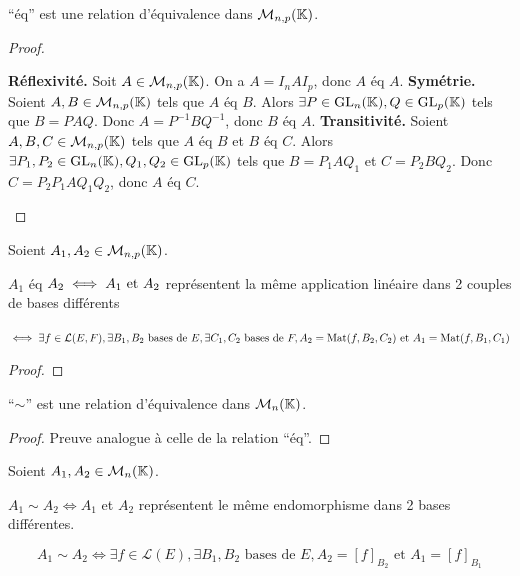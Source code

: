 \documentclass[12pt,a4paper]{report}
\begin{document}
\begin{property}
    ``éq'' est une relation d'équivalence dans $\mathcal M_{n,p}(\mathbb{K})$.
\end{property}

\begin{proof}
    \begin{outline}
        \1 \textbf{Réflexivité.} Soit $A \in \mathcal M_{n,p}(\mathbb{K})$. On a $A = I_n A I_p$, donc $A \text{ éq } A$.
        \1 \textbf{Symétrie.} Soient $A,B \in \mathcal M_{n,p}(\mathbb{K})$ tels que $A \text{ éq } B$. Alors $\exists P \in \mathrm{GL}_n(\mathbb{K}), Q \in \mathrm{GL}_p(\mathbb{K})$ tels que $B = PAQ$. Donc $A = P^{-1} B Q^{-1}$, donc $B \text{ éq } A$.
        \1 \textbf{Transitivité.} Soient $A,B,C \in \mathcal M_{n,p}(\mathbb{K})$ tels que $A \text{ éq } B$ et $B \text{ éq } C$. Alors $\exists P_1,P_2 \in \mathrm{GL}_n(\mathbb{K}), Q_1,Q_2 \in \mathrm{GL}_p(\mathbb{K})$ tels que $B = P_1 A Q_1$ et $C = P_2 B Q_2$. Donc $C = P_2 P_1 A Q_1 Q_2$, donc $A \text{ éq } C$.
    \end{outline}
\end{proof}

\begin{property}
    Soient $A_1,A_2 \in \mathcal M_{n,p}(\mathbb{K})$.

    $A_1$ éq $A_2 \iff A_1 \text{ et } A_2$ représentent la même application linéaire dans 2 couples de bases différents

    $\iff \exists f \in \mathcal L(E,F), \exists B_1,B_2 \text{ bases de } E, \exists C_1,C_2 \text{ bases de } F, A_2 = \mathrm{Mat}(f,B_2,C_2) \text{ et } A_1 = \mathrm{Mat}(f,B_1,C_1)$
\end{property}

\begin{proof}
    
\end{proof}

\begin{property}
    ``$\sim$'' est une relation d'équivalence dans $\mathcal M_n(\mathbb{K})$.
\end{property}

\begin{proof}
    Preuve analogue à celle de la relation ``éq''.
\end{proof}

\begin{property}
    Soient $A_1,A_2 \in \mathcal M_n(\mathbb{K})$.

    $A_1 \sim A_2 \iff A_1$ et $A_2$ représentent le même endomorphisme dans 2 bases différentes.

    $$A_1 \sim A_2 \iff \exists f \in \mathcal L(E), \exists B_1,B_2 \text{ bases de } E, A_2 = [f]_{B_2} \text{ et } A_1 = [f]_{B_1}$$
\end{property}
\end{document}
